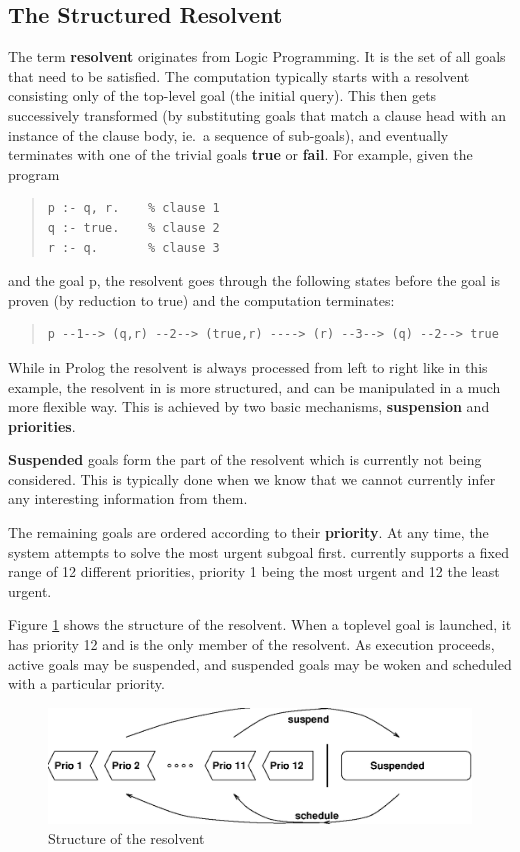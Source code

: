 \subsection{The Structured Resolvent}
The term {\bf resolvent} originates from Logic Programming.
It is the set of all goals that need to be satisfied.
The computation typically starts with a resolvent consisting only of the top-level goal
(the initial query).
This then gets successively transformed (by substituting goals that
match a clause head with an instance of the clause body, ie.\ a
sequence of sub-goals),
and eventually terminates with one of the trivial goals
{\bf true} or {\bf fail}.
For example, given the program
\begin{quote}\begin{verbatim}
p :- q, r.    % clause 1
q :- true.    % clause 2
r :- q.       % clause 3
\end{verbatim}\end{quote}
and the goal p, the resolvent goes through the following states
before the goal is proven (by reduction to true) and the computation terminates:
\begin{quote}\begin{verbatim}
p --1--> (q,r) --2--> (true,r) ----> (r) --3--> (q) --2--> true
\end{verbatim}\end{quote}

While in Prolog the resolvent is always processed from left to right
like in this example,
the resolvent in {\eclipse} is more structured, and can be manipulated
in a much more flexible way.
This is achieved by two basic mechanisms, {\bf suspension}
and {\bf priorities}.

{\bf Suspended} goals form the part of the resolvent which is
currently not being considered. This is typically done when we
know that we cannot currently infer any interesting information from them.

The remaining goals are ordered according to their {\bf priority}.
At any time, the system attempts to solve the most urgent subgoal first.
{\eclipse} currently supports a fixed range of 12 different priorities,
priority 1 being the most urgent and 12 the least urgent.

Figure \ref{figresolv} shows the structure of the resolvent.
When a toplevel goal is launched, it has priority 12 and is the only
member of the resolvent. As execution proceeds, active goals may be
suspended, and suspended goals may be woken and scheduled with a
particular priority.
\begin{figure}
\includegraphics{resolv.eps}
\caption{Structure of the resolvent}
\label{figresolv}
\end{figure}

